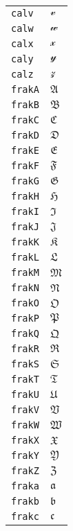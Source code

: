 \begin{longtable}{ll}
\texttt{calv}&${}{\mathcal{v}}{}$\\
\texttt{calw}&${}{\mathcal{w}}{}$\\
\texttt{calx}&${}{\mathcal{x}}{}$\\
\texttt{caly}&${}{\mathcal{y}}{}$\\
\texttt{calz}&${}{\mathcal{z}}{}$\\
\texttt{frakA}&${}{\mathfrak{A}} {}$\\
\texttt{frakB}&${}{\mathfrak{B}} {}$\\
\texttt{frakC}&${}{\mathfrak{C}} {}$\\
\texttt{frakD}&${}{\mathfrak{D}} {}$\\
\texttt{frakE}&${}{\mathfrak{E}} {}$\\
\texttt{frakF}&${}{\mathfrak{F}} {}$\\
\texttt{frakG}&${}{\mathfrak{G}} {}$\\
\texttt{frakH}&${}{\mathfrak{H}} {}$\\
\texttt{frakI}&${}{\mathfrak{I}} {}$\\
\texttt{frakJ}&${}{\mathfrak{J}} {}$\\
\texttt{frakK}&${}{\mathfrak{K}} {}$\\
\texttt{frakL}&${}{\mathfrak{L}} {}$\\
\texttt{frakM}&${}{\mathfrak{M}} {}$\\
\texttt{frakN}&${}{\mathfrak{N}} {}$\\
\texttt{frakO}&${}{\mathfrak{O}} {}$\\
\texttt{frakP}&${}{\mathfrak{P}} {}$\\
\texttt{frakQ}&${}{\mathfrak{Q}} {}$\\
\texttt{frakR}&${}{\mathfrak{R}} {}$\\
\texttt{frakS}&${}{\mathfrak{S}} {}$\\
\texttt{frakT}&${}{\mathfrak{T}} {}$\\
\texttt{frakU}&${}{\mathfrak{U}} {}$\\
\texttt{frakV}&${}{\mathfrak{V}} {}$\\
\texttt{frakW}&${}{\mathfrak{W}} {}$\\
\texttt{frakX}&${}{\mathfrak{X}} {}$\\
\texttt{frakY}&${}{\mathfrak{Y}} {}$\\
\texttt{frakZ}&${}{\mathfrak{Z}} {}$\\
\texttt{fraka}&${}{\mathfrak{a}} {}$\\
\texttt{frakb}&${}{\mathfrak{b}} {}$\\
\texttt{frakc}&${}{\mathfrak{c}} {}$\\

\end{longtable}
